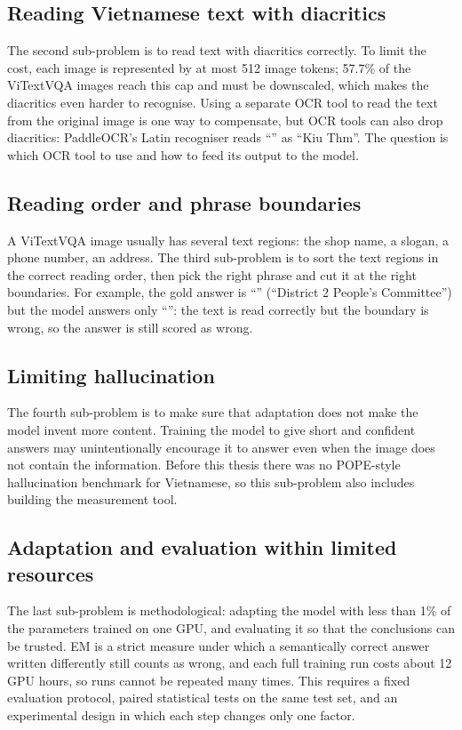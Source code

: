 \subsection{Reading Vietnamese text with diacritics}

The second sub-problem is to read text with diacritics correctly. To limit the cost,
each image is represented by at most 512 image tokens; 57.7\% of the ViTextVQA images
reach this cap and must be downscaled, which makes the diacritics even harder to
recognise. Using a separate OCR tool to read the text from the original image is one
way to compensate, but OCR tools can also drop diacritics: PaddleOCR's Latin
recogniser reads ``'' as ``Kiu Thm''. The question is which OCR tool to
use and how to feed its output to the model.

\subsection{Reading order and phrase boundaries}

A ViTextVQA image usually has several text regions: the shop name, a slogan, a phone
number, an address. The third sub-problem is to sort the text regions in the
correct reading order, then pick the right phrase and cut it at the right
boundaries. For example, the gold answer is ``'' (``District
2 People's Committee'') but the model answers only ``'': the text
is read correctly but the boundary is wrong, so the answer is still scored as wrong.

\subsection{Limiting hallucination}

The fourth sub-problem is to make sure that adaptation does not make the model
invent more content. Training the model to give short and confident answers may
unintentionally encourage it to answer even when the image does not contain the
information. Before this thesis there was no POPE-style~\cite{li2023pope}
hallucination benchmark for Vietnamese, so this sub-problem also includes building
the measurement tool.

\subsection{Adaptation and evaluation within limited resources}

The last sub-problem is methodological: adapting the model with less than 1\% of
the parameters trained on one GPU, and evaluating it so that the conclusions can be
trusted. EM is a strict measure under which a semantically correct answer written
differently still counts as wrong, and each full training run costs about 12 GPU
hours, so runs cannot be repeated many times. This requires a fixed evaluation
protocol, paired statistical tests on the same test set, and an experimental design
in which each step changes only one factor.

